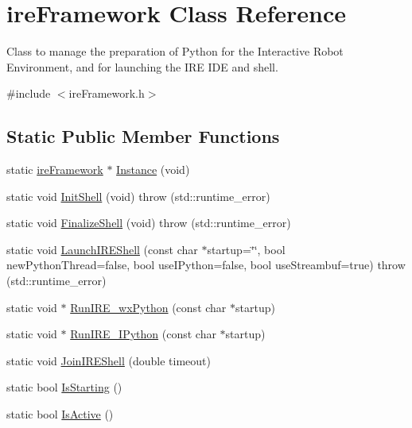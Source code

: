 \hypertarget{classire_framework}{\section{ire\-Framework Class Reference}
\label{classire_framework}
}


Class to manage the preparation of Python for the Interactive Robot Environment, and for launching the I\-R\-E I\-D\-E and shell.  




{\ttfamily \#include $<$ire\-Framework.\-h$>$}

\subsection*{Static Public Member Functions}
\begin{DoxyCompactItemize}
\item 
static \hyperlink{classire_framework}{ire\-Framework} $\ast$ \hyperlink{classire_framework_a7837e9abe5dc13a4d7c0e817f0f926e8}{Instance} (void)
\item 
static void \hyperlink{classire_framework_aca291a20c2f723f18ad82eb14fb9825e}{Init\-Shell} (void)  throw (std\-::runtime\-\_\-error)
\item 
static void \hyperlink{classire_framework_ab169db7d19be341488c4297ff7f75152}{Finalize\-Shell} (void)  throw (std\-::runtime\-\_\-error)
\item 
static void \hyperlink{classire_framework_a5d86bd34ba4afc41dcca790fed6becfc}{Launch\-I\-R\-E\-Shell} (const char $\ast$startup=\char`\"{}\char`\"{}, bool new\-Python\-Thread=false, bool use\-I\-Python=false, bool use\-Streambuf=true)  throw (std\-::runtime\-\_\-error)
\item 
static void $\ast$ \hyperlink{classire_framework_a36bb4fb2474b82d92ee0044da5113dde}{Run\-I\-R\-E\-\_\-wx\-Python} (const char $\ast$startup)
\item 
static void $\ast$ \hyperlink{classire_framework_ae812e959980c7ab3e7d72e0439f18833}{Run\-I\-R\-E\-\_\-\-I\-Python} (const char $\ast$startup)
\item 
static void \hyperlink{classire_framework_a272dfb38dadc652b543493a608061399}{Join\-I\-R\-E\-Shell} (double timeout)
\item 
static bool \hyperlink{classire_framework_a05c01077622e8377c87b8d2e60e4add6}{Is\-Starting} ()
\item 
static bool \hyperlink{classire_framework_a9f202e6d71fc142a9d22a479ce52748c}{Is\-Active} ()

\end{DoxyCompactItemize}
